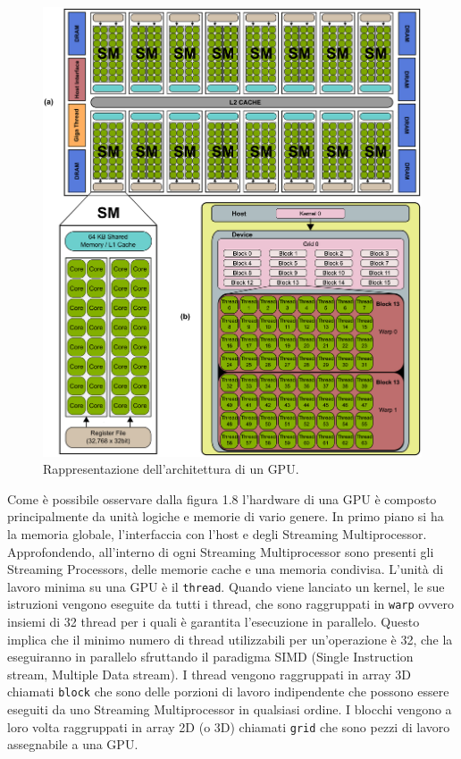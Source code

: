 \documentclass[12pt,a4paper]{report}
\begin{document}
\begin{figure}[H]
    \centering
    \includegraphics[scale=0.7]{img/arc-gpu.png}
    \caption{Rappresentazione dell'architettura di un GPU. 
}
\end{figure} \newpage

Come è possibile osservare dalla figura 1.8 l'hardware di una GPU è composto principalmente da unità logiche e memorie di vario genere.
In primo piano si ha la memoria globale, l'interfaccia con l'host e degli Streaming Multiprocessor. Approfondendo, all'interno di ogni Streaming Multiprocessor sono presenti gli Streaming Processors, delle memorie cache e una memoria condivisa. \newline 
L'unità di lavoro minima su una GPU è il \verb|thread|. Quando viene lanciato un kernel, le sue istruzioni vengono eseguite da tutti i thread, che sono raggruppati in \verb|warp| ovvero insiemi di 32 thread per i quali è garantita l'esecuzione in parallelo. Questo implica che il minimo numero di thread utilizzabili per un'operazione è 32, che la eseguiranno in parallelo sfruttando il paradigma SIMD (Single Instruction stream, Multiple Data stream).\newline
I thread vengono raggruppati in array 3D chiamati \verb|block| che sono delle porzioni di lavoro indipendente che possono essere eseguiti da uno Streaming Multiprocessor in qualsiasi ordine. \newline
I blocchi vengono a loro volta raggruppati in array 2D (o 3D) chiamati \verb|grid| che sono pezzi di lavoro assegnabile a una GPU.
\end{document}
